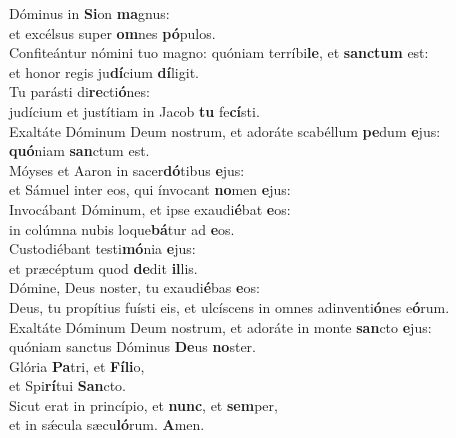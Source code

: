 \evenverse Dóminus in \textbf{Si}on \textbf{ma}gnus:~\*\\
\evenverse et excélsus super \textbf{om}nes \textbf{pó}pulos.\\
\oddverse Confiteántur nómini tuo magno: quóniam terríbi\textbf{le}, et \textbf{san}\textbf{ctum} est:~\*\\
\oddverse et honor regis ju\textbf{dí}cium \textbf{dí}ligit.\\
\evenverse Tu parásti di\textbf{re}cti\textbf{ó}nes:~\*\\
\evenverse judícium et justítiam in Jacob \textbf{tu} fe\textbf{cí}sti.\\
\oddverse Exaltáte Dóminum Deum nostrum, et adoráte scabéllum \textbf{pe}dum \textbf{e}jus:~\*\\
\oddverse \textbf{quó}niam \textbf{san}ctum est.\\
\evenverse Móyses et Aaron in sacer\textbf{dó}tibus \textbf{e}jus:~\*\\
\evenverse et Sámuel inter eos, qui ínvocant \textbf{no}men \textbf{e}jus:\\
\oddverse Invocábant Dóminum, et ipse exaudi\textbf{é}bat \textbf{e}os:~\*\\
\oddverse in colúmna nubis loque\textbf{bá}tur ad \textbf{e}os.\\
\evenverse Custodiébant testi\textbf{mó}nia \textbf{e}jus:~\*\\
\evenverse et præcéptum quod \textbf{de}dit \textbf{il}lis.\\
\oddverse Dómine, Deus noster, tu exaudi\textbf{é}bas \textbf{e}os:~\*\\
\oddverse Deus, tu propítius fuísti eis, et ulcíscens in omnes adinventi\textbf{ó}nes e\textbf{ó}rum.\\
\evenverse Exaltáte Dóminum Deum nostrum, et adoráte in monte \textbf{san}cto \textbf{e}jus:~\*\\
\evenverse quóniam sanctus Dóminus \textbf{De}us \textbf{no}ster.\\
\oddverse Glória \textbf{Pa}tri, et \textbf{Fí}\textbf{li}o,~\*\\
\oddverse et Spi\textbf{rí}tui \textbf{San}cto.\\
\evenverse Sicut erat in princípio, et \textbf{nunc}, et \textbf{sem}per,~\*\\
\evenverse et in sǽcula sæcu\textbf{ló}rum. \textbf{A}men.\\
